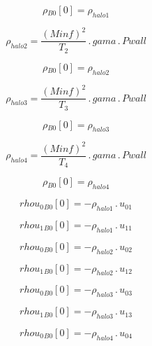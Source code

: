 \documentclass{article}
\begin{document}
\begin{dmath}{\rho{_{B0}}}[{0}] = \rho_{halo 1}\end{dmath}

\begin{dmath}\rho_{halo 2} = \frac{\left(Minf \right)^{2}}{T_{2}} \,.\, gama \,.\, Pwall\end{dmath}

\begin{dmath}{\rho{_{B0}}}[{0}] = \rho_{halo 2}\end{dmath}

\begin{dmath}\rho_{halo 3} = \frac{\left(Minf \right)^{2}}{T_{3}} \,.\, gama \,.\, Pwall\end{dmath}

\begin{dmath}{\rho{_{B0}}}[{0}] = \rho_{halo 3}\end{dmath}

\begin{dmath}\rho_{halo 4} = \frac{\left(Minf \right)^{2}}{T_{4}} \,.\, gama \,.\, Pwall\end{dmath}

\begin{dmath}{\rho{_{B0}}}[{0}] = \rho_{halo 4}\end{dmath}

\begin{dmath}{rhou_{0}{_{B0}}}[{0}] = - \rho_{halo 1} \,.\, u_{01}\end{dmath}

\begin{dmath}{rhou_{1}{_{B0}}}[{0}] = - \rho_{halo 1} \,.\, u_{11}\end{dmath}

\begin{dmath}{rhou_{0}{_{B0}}}[{0}] = - \rho_{halo 2} \,.\, u_{02}\end{dmath}

\begin{dmath}{rhou_{1}{_{B0}}}[{0}] = - \rho_{halo 2} \,.\, u_{12}\end{dmath}

\begin{dmath}{rhou_{0}{_{B0}}}[{0}] = - \rho_{halo 3} \,.\, u_{03}\end{dmath}

\begin{dmath}{rhou_{1}{_{B0}}}[{0}] = - \rho_{halo 3} \,.\, u_{13}\end{dmath}

\begin{dmath}{rhou_{0}{_{B0}}}[{0}] = - \rho_{halo 4} \,.\, u_{04}\end{dmath}
\end{document}
